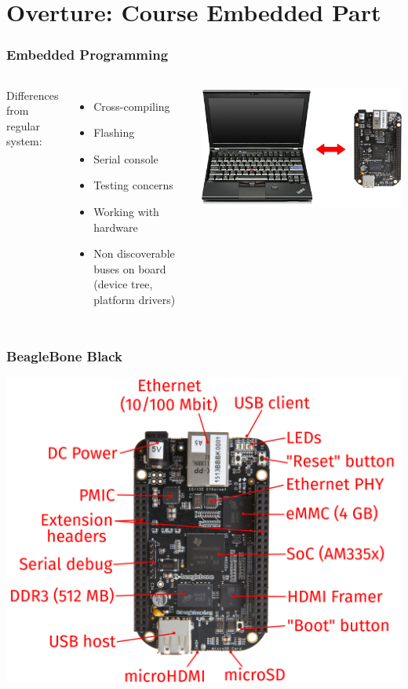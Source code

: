 \section{Overture: Course Embedded Part}

\begin{frame}
  \frametitle{Embedded Programming}
  \begin{columns}
      Differences from regular system:
      \begin{itemize}
        \item Cross-compiling
        \item Flashing
        \item Serial console
        \item Testing concerns
        \item Working with hardware
        \item Non discoverable buses on board (device tree, platform drivers)
      \end{itemize}
      \includegraphics[scale=0.27]{images/host-target.jpg}
  \end{columns}
\end{frame}

\begin{frame}
  \frametitle{BeagleBone Black}
  \begin{center}
    \includegraphics[scale=0.82]{images/bbb02.png}
  \end{center}
\end{frame}

